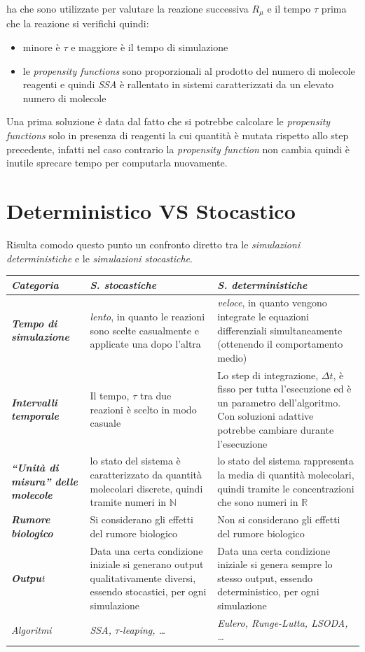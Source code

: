 \documentclass[a4paper,12pt, oneside]{book}
\begin{document}
ha che sono utilizzate per valutare la reazione successiva $R_\mu$ e il tempo
$\tau$ prima che la reazione si verifichi quindi:
\begin{itemize}
  \item minore è $\tau$ e maggiore è il tempo di simulazione
  \item le \textit{propensity functions} sono proporzionali al prodotto del
  numero di molecole reagenti e quindi \textit{SSA} è rallentato in sistemi
  caratterizzati da un elevato numero di molecole
\end{itemize}
Una prima soluzione è data dal fatto che si potrebbe calcolare le
\textit{propensity functions} solo in presenza di reagenti la cui quantità è
mutata rispetto allo step precedente, infatti nel caso contrario la
\textit{propensity function} non cambia quindi è inutile sprecare tempo per
computarla nuovamente.
\section{Deterministico VS Stocastico}
Risulta comodo questo punto un confronto diretto tra le \textit{simulazioni
  deterministiche} e le \textit{simulazioni stocastiche}.
\begin{table}[H]
  \centering
  \small
  \begin{tabulary}{\linewidth}{p{5em}|p{13em}|p{14em}}
    \textit{Categoria} & \textbf{\textit{S. stocastiche}}
    & \textbf{\textit{S. deterministiche}}\\
    \hline
    \textit{\textbf{Tempo di simulazione}}
    & \textit{lento}, in quanto le reazioni
    sono scelte casualmente e applicate una dopo
    l'altra
    & \textit{veloce}, in quanto vengono integrate le equazioni differenziali
    simultaneamente (ottenendo il comportamento medio)\\
    \hline
    \textit{\textbf{Intervalli temporale}}
    & Il tempo, $\tau$ tra due reazioni è scelto
    in modo casuale
    & Lo step di integrazione, $\Delta t$, è fisso per tutta l'esecuzione ed è
    un parametro
    dell'algoritmo. Con soluzioni adattive potrebbe cambiare durante
    l'esecuzione  \\
    \hline
    \textit{\textbf{``Unità di misura'' delle molecole}}
    & lo stato del sistema è caratterizzato da quantità molecolari discrete,
    quindi tramite numeri in $\mathbb{N}$
    & lo stato del sistema rappresenta la media di quantità molecolari, quindi
    tramite le concentrazioni che sono numeri in $\mathbb{R}$\\
    \hline
    \textit{\textbf{Rumore biologico}}
    & Si considerano gli effetti del rumore biologico
    & Non si considerano gli effetti del rumore biologico\\
    \hline
    \textit{\textbf{Outpu}t}
    & Data una certa condizione iniziale si generano output qualitativamente
    diversi, essendo stocastici, per ogni simulazione
    & Data una certa condizione iniziale si genera sempre lo stesso output,
    essendo deterministico, per ogni simulazione  \\
    \hline
    \textit{Algoritmi}
    & \textit{SSA, $\tau$-leaping, \ldots} & \textit{Eulero, Runge-Lutta,
      LSODA, \ldots} 
  \end{tabulary}
\end{table}
\end{document}
